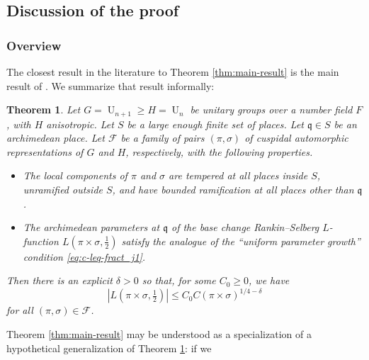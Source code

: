 \documentclass[reqno]{amsart}
\DeclareMathOperator{\U}{U}
\theoremstyle{plain} \newtheorem{theorem} {Theorem}
\theoremstyle{definition} \newtheorem{definition} [theorem] {Definition}
\theoremstyle{itplain} %
\numberwithin{equation}{section}
\numberwithin{theorem}{section}
\renewcommand{\geq}{\geqslant}
\renewcommand{\leq}{\leqslant}
\begin{document}
\subsection{Discussion of the proof}\label{sec:high-level-overview}

\subsubsection{Overview}

The closest result in the literature to Theorem \ref{thm:main-result} is the main result of \cite{2020arXiv201202187N}.  We summarize that result informally:
\begin{theorem}\label{thm:unitary-review}
  Let $G = \U_{n+1} \geq H = \U_n$ be unitary groups over a number field $F$, with $H$ anisotropic.  Let $S$ be a large enough finite set of places.   Let $\mathfrak{q} \in S$ be an archimedean place.   Let $\mathcal{F}$ be a family of pairs $(\pi,\sigma)$ of cuspidal automorphic representations of $G$ and $H$, respectively, with the following properties.
  \begin{itemize}
  \item The local components of $\pi$ and $\sigma$ are tempered at all places inside $S$, unramified outside $S$, and have bounded ramification at all places other than $\mathfrak{q}$.
  \item The archimedean parameters at $\mathfrak{q}$ of the base change Rankin--Selberg $L$-function  $L(\pi \times \sigma, \tfrac{1}{2})$ satisfy the analogue of the ``uniform parameter growth'' condition \eqref{eq:c-leq-fract_j1}.
  \end{itemize}
  Then there is an explicit $\delta > 0$ so that, for some $C_0 \geq 0$, we have
  \begin{equation*}
    |L(\pi \times \sigma, \tfrac{1}{2})| \leq C_0 C(\pi \times \sigma)^{1/4-\delta}
  \end{equation*}
  for all $(\pi,\sigma) \in \mathcal{F}$.
\end{theorem}
Theorem \ref{thm:main-result} may be understood as a specialization of a hypothetical generalization of Theorem \ref{thm:unitary-review}: if we
\end{document}
